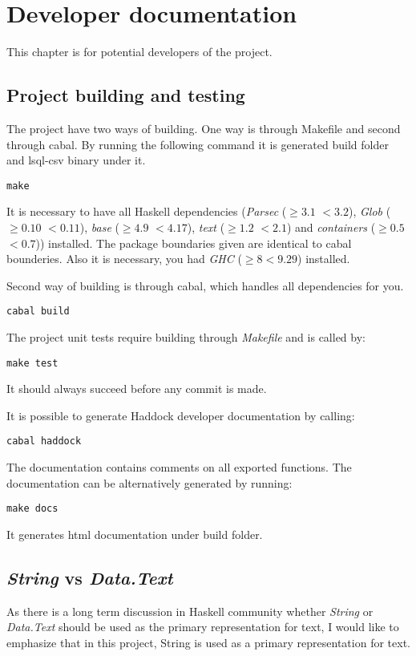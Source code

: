 \chapter{Developer documentation}
This chapter is for potential developers of the project.

\section{Project building and testing}
The project have two ways of building. One way is through Makefile and second through cabal. 
By running the following command it is generated build folder and lsql-csv binary under it.
\begin{verbatim}
make
\end{verbatim}
 
It is necessary to have all Haskell dependencies (\textit{Parsec} ($\geq 3.1$ $<3.2$), \textit{Glob} ($\geq 0.10$ $<0.11$), 
\textit{base} ($\geq 4.9$ $<4.17$), \textit{text} ($\geq 1.2$ $<2.1$) and \textit{containers} ($\geq 0.5$ $<0.7$)) installed.
The package boundaries given are identical to cabal bounderies. Also it is necessary, you had \textit{GHC} ($\geq 8 <9.29$) installed.

Second way of building is through cabal, which handles all dependencies for you.

\begin{verbatim}
cabal build
\end{verbatim}


The project unit tests require building through \textit{Makefile} and is called by:
\begin{verbatim}
make test
\end{verbatim}
It should always succeed before any commit is made.

It is possible to generate Haddock developer documentation by calling:

\begin{verbatim}
cabal haddock
\end{verbatim}

The documentation contains comments on all exported functions. The documentation can be alternatively generated
by running:

\begin{verbatim}
make docs
\end{verbatim}

It generates html documentation under build folder.

\section{\textit{String} vs \textit{Data.Text}}
As there is a long term discussion in Haskell community whether \textit{String} or \textit{Data.Text} should be used as the 
primary representation for text, I would like to emphasize that in this project, String is used as a primary
representation for text.

